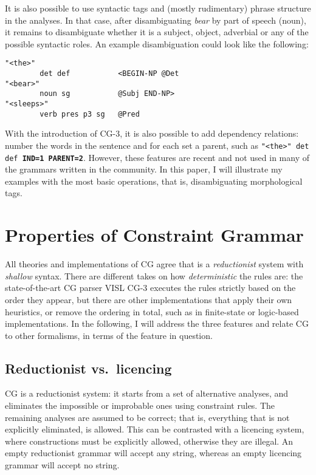 It is also possible to use syntactic tags and (mostly rudimentary) phrase
structure in the analyses. In that
case, after disambiguating \emph{bear} by part of speech (noun), it
remains to disambiguate whether it is a subject, object, adverbial or
any of the possible syntactic roles. An example disambiguation could
look like the following:


\begin{verbatim}
"<the>"
        det def           <BEGIN-NP @Det
"<bear>"
        noun sg           @Subj END-NP>
"<sleeps>"
        verb pres p3 sg   @Pred

\end{verbatim}

With the introduction of CG-3, it is also possible to add dependency
relations: number the words in the sentence and for each set a parent,
such as \texttt{"<the>" det def  \textbf{IND=1 PARENT=2}}. However, these features
are recent and not used in many of the grammars written in the
community. In this paper, I will illustrate my examples with the most
basic operations, that is, disambiguating morphological tags.


\section{Properties of Constraint
Grammar}\label{properties-of-constraint-grammar}

All theories and implementations of CG agree that is a \emph{reductionist}
system with \emph{shallow} syntax. There are different takes on how
\emph{deterministic} the rules are: the state-of-the-art CG parser VISL CG-3
executes the rules strictly based on the order they appear, but there
are other implementations that apply their own heuristics, or remove the
ordering in total, such as in finite-state or logic-based
implementations. In the following, I will address the three features and relate CG to
other formalisms, in terms of the feature in question.

\subsection*{Reductionist vs.~licencing}\label{reductionist-vs.licencing}

CG is a reductionist system: it starts from a set of alternative
analyses, and eliminates the impossible or improbable ones using
constraint rules. The remaining analyses are assumed to be correct; that
is, everything that is not explicitly eliminated, is allowed. This can
be contrasted with a licencing system, where constructions must
be explicitly allowed, otherwise they are illegal. An empty
reductionist grammar will accept any string, whereas an empty
licencing grammar will accept no string.

